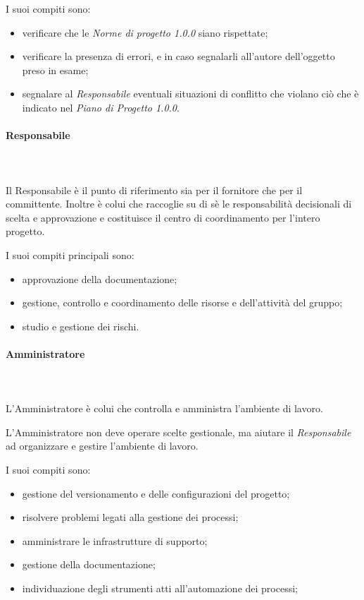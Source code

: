    			I suoi compiti sono:
   			\begin{itemize}
   				\item verificare che le \textit{Norme di progetto 1.0.0} siano rispettate;
   				\item verificare la presenza di errori, e in caso segnalarli all'autore dell'oggetto preso in esame;
   				\item segnalare al \textit{Responsabile} eventuali situazioni di conflitto che violano ciò che è indicato nel \textit{Piano di Progetto 1.0.0}.
   			\end{itemize}
   			\paragraph{Responsabile} \mbox{}\\ \mbox{}\\
   			Il Responsabile è il punto di riferimento sia per il fornitore che per il committente. Inoltre è colui che raccoglie su di sè le responsabilità decisionali di scelta e approvazione e costituisce il centro di coordinamento per l'intero progetto.

   			I suoi compiti principali sono:
   			\begin{itemize}
   				\item approvazione della documentazione;
   				\item gestione, controllo e coordinamento delle risorse e dell'attività del gruppo;
   				\item studio e gestione dei rischi.
   			\end{itemize}
   			\paragraph{Amministratore} \mbox{}\\ \mbox{}\\
   			L'Amministratore è colui che controlla e amministra l'ambiente di lavoro.

   			L'Amministratore non deve operare scelte gestionale, ma aiutare il \textit{Responsabile} ad organizzare e gestire l'ambiente di lavoro.

   			I suoi compiti sono:
   			\begin{itemize}
   				\item gestione del versionamento e delle configurazioni del progetto;
   				\item risolvere problemi legati alla gestione dei processi;
   				\item amministrare le infrastrutture di supporto;
   				\item gestione della documentazione;
   				\item individuazione degli strumenti atti all'automazione dei processi;
   			\end{itemize}
